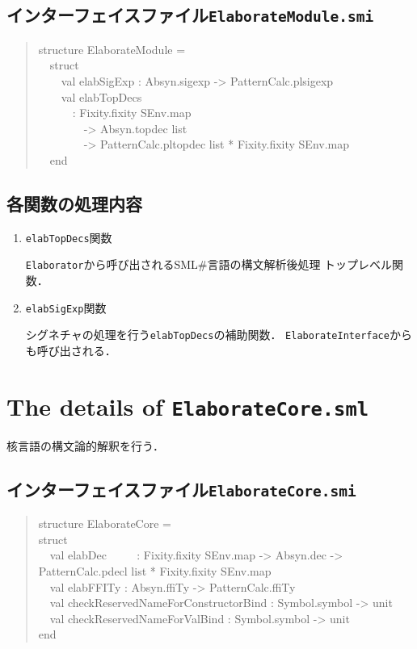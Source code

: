 \documentclass{jbook}
\newcommand{\txt}[2]{#2}
\newcommand{\smlsharp}{SML\#}
\newcommand{\code}[1]{\mbox{\large\tt #1}}
\newcommand{\myem}{\mbox{\ \ }}
\newenvironment{program}{\begin{quote}\begin{tt}}%
                        {\end{tt}\end{quote}}
\begin{document}
\subsection{インターフェイスファイル\code{ElaborateModule.smi}}
\begin{program}
structure ElaborateModule =\\
\myem  struct\\
\myem\myem    val elabSigExp : Absyn.sigexp -> PatternCalc.plsigexp\\
\myem\myem    val elabTopDecs\\
\myem\myem\myem        : Fixity.fixity SEnv.map\\
\myem\myem\myem\myem          -> Absyn.topdec list\\
\myem\myem\myem\myem          -> PatternCalc.pltopdec list * Fixity.fixity SEnv.map\\
\myem  end
\end{program}
\subsection{各関数の処理内容}
\begin{enumerate}
\item \code{elabTopDecs}関数

	\code{Elaborator}から呼び出される\smlsharp{}言語の構文解析後処理
トップレベル関数．

\item \code{elabSigExp}関数

	シグネチャの処理を行う\code{elabTopDecs}の補助関数．
	\code{ElaborateInterface}からも呼び出される．

\end{enumerate}
\else%
\fi%


\section{\txt{\code{ElaborateCore.sml}の処理の詳細}{The details of \code{ElaborateCore.sml}}}
\ifjp%

	核言語の構文論的解釈を行う．

\subsection{インターフェイスファイル\code{ElaborateCore.smi}}
\begin{program}
structure ElaborateCore =\\
struct\\
\myem  val elabDec 
\myem\myem
    : Fixity.fixity SEnv.map -> Absyn.dec -> PatternCalc.pdecl list * Fixity.fixity SEnv.map\\
\myem  val elabFFITy : Absyn.ffiTy -> PatternCalc.ffiTy\\
\myem  val checkReservedNameForConstructorBind : Symbol.symbol -> unit\\
\myem  val checkReservedNameForValBind : Symbol.symbol -> unit\\
end
\end{program}
\end{document}
